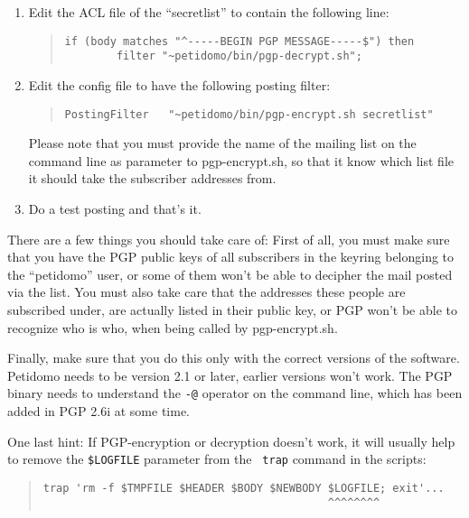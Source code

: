 \documentclass[a4paper,11pt]{scrreprt}
\newcommand{\file}[1]{{\sf #1}}
\begin{document}
\begin{enumerate}
\item Edit the ACL file of the ``secretlist'' to contain the following
line:

\begin{quote}
\begin{verbatim}
if (body matches "^-----BEGIN PGP MESSAGE-----$") then
        filter "~petidomo/bin/pgp-decrypt.sh";
\end{verbatim}
\end{quote}

\item Edit the config file to have the following posting filter:

\begin{quote}
\begin{verbatim}
PostingFilter   "~petidomo/bin/pgp-encrypt.sh secretlist"
\end{verbatim}
\end{quote}

Please note that you must provide the name of the mailing list on the
command line as parameter to \file{pgp-encrypt.sh}, so that it know
which list file it should take the subscriber addresses from.

\item Do a test posting and that's it.

\end{enumerate}

There are a few things you should take care of: First of all, you must
make sure that you have the PGP public keys of all subscribers in the
keyring belonging to the ``petidomo'' user, or some of them won't be
able to decipher the mail posted via the list. You must also take care
that the addresses these people are subscribed under, are actually
listed in their public key, or PGP won't be able to recognize who is
who, when being called by \file{pgp-encrypt.sh}.

Finally, make sure that you do this only with the correct versions of
the software. Petidomo needs to be version 2.1 or later, earlier
versions won't work. The PGP binary needs to understand the {\tt -@}
operator on the command line, which has been added in PGP 2.6i at some
time.

One last hint: If PGP-encryption or decryption doesn't work, it will
usually help to remove the {\tt \$LOGFILE} parameter from the {\tt
trap} command in the scripts:

\begin{quote}
\begin{verbatim}
trap 'rm -f $TMPFILE $HEADER $BODY $NEWBODY $LOGFILE; exit'...
                                            ^^^^^^^^
\end{verbatim}
\end{quote}
\end{document}
